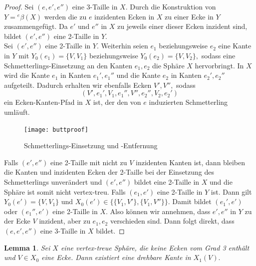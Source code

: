 \documentclass[12pt,titlepage,twoside,cleardoublepage]{article}
\theoremstyle{nummermitklammern}
\newtheorem{lemma}[temp]{Lemma}
\newtheorem{lemma}[zahl]{Lemma}
\numberwithin{equation}{section}
\begin{document}
 \begin{proof}
 Sei $(e,e',e'')$ eine 3-Taille in $X.$ Durch die Konstruktion von $Y={}^e\beta(X)$ werden die zu $e$ inzidenten Ecken in $X$ zu einer Ecke in $Y$ zusammengefügt. Da $e'$ und $e''$ in $X$ zu jeweils einer dieser Ecken inzident sind, bildet $(e',e'')$ eine 2-Taille in $Y$.\\
 Sei $(e',e'')$ eine 2-Taille in $Y.$ Weiterhin seien $e_1$ beziehungsweise $e_2$ eine Kante in $Y$ mit $Y_0(e_1)=\{V,V_1\}$ beziehungsweise $Y_0(e_2)=\{V,V_2\},$ sodass eine Schmetterlings-Einsetzung an den Kanten $e_1,e_2$ die Sphäre $X$ hervorbringt. In $X$ wird die Kante $e_1$ in Kanten $e_1',e_1''$ und die Kante $e_2$ in Kanten $e_2',e_2''$ aufgeteilt. Dadurch erhalten wir ebenfalls Ecken $V',V'',$ sodass 
 \[
(V',e_1',V_1,e_1'',V'',e_2'',V_2,e_2') 
 \]
 ein Ecken-Kanten-Pfad in $X$ ist, der den von $e$ induzierten Schmetterling umläuft.
 \begin{figure}[H]
\begin{center}
\texttt{[image: buttproof]}
\end{center}
\caption{Schmetterlings-Einsetzung und -Entfernung}
\end{figure}
 Falls $(e',e'')$ eine 2-Taille mit nicht zu $V$ inzidenten Kanten ist, dann bleiben die Kanten und inzidenten Ecken der 2-Taille bei der Einsetzung des Schmetterlings unverändert und $(e',e'')$ bildet eine 2-Taille in $X$ und die Sphäre ist somit nicht vertex-treu. Falls $(e_1,e')$ eine 2-Taille in $Y$ ist. Dann gilt $Y_0(e')=\{V,V_1\}$ und $X_0(e')\in\{\{V_1,V'\},\{V_1,V''\}\}$. Damit bildet $(e_1',e')$ oder $(e_1'',e')$ eine 2-Taille in $X.$ Also können wir annehmen, dass $e',e''$ in $Y$ zu der Ecke $V$ inzident, aber zu $e_1,e_2$ verschieden sind. Dann folgt direkt, dass $(e,e',e'')$ eine 3-Taille in $X$ bildet.
  \end{proof}
  \begin{lemma}\label{c}
  Sei $X$ eine vertex-treue Sphäre, die keine Ecken vom Grad 3 enthält und $V\in X_0$ eine Ecke. Dann existiert eine drehbare Kante in $X_1(V).$
  \end{lemma}
\end{document}
